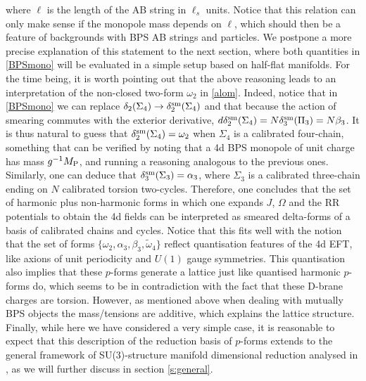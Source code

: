 \documentclass[11pt]{article}
\def\a {\alpha}
\def\b {\beta}
\def\om{\omega}
\begin{document}
where $\ell$ is the length of the AB string in $\ell_s$ units.  Notice that this relation can only make sense if the monopole mass depends on $\ell$, which should then be a feature of  backgrounds with BPS AB strings and particles. We postpone a more precise explanation of this statement to the next section, where both quantities in \eqref{BPSmono} will be evaluated in a simple setup based on half-flat manifolds. For the time being, it is worth pointing out that the above reasoning leads to an interpretation of the non-closed two-form $\om_2$ in \eqref{alom}. Indeed, notice that in \eqref{BPSmono} we can replace $\delta_2(\Sigma_4) \to \delta_2^{\rm sm}(\Sigma_4)$ and that because the action of smearing commutes with the exterior derivative, $d \delta_2^{\rm sm}(\Sigma_4) = N \delta_3^{\rm sm}(\Pi_3) = N \b_3$. It is thus natural to guess that $\delta_2^{\rm sm}(\Sigma_4) = \om_2$ when $\Sigma_4$ is a calibrated four-chain, something that can be verified by noting that a 4d BPS monopole of unit charge has mass $g^{-1} M_{\rm P}$, and running a reasoning analogous to the previous ones. Similarly, one can deduce that $\delta^{\rm sm}_3(\Sigma_3) = \a_3$, where $\Sigma_3$ is a calibrated three-chain ending on $N$ calibrated torsion two-cycles. Therefore, one concludes that the set of harmonic plus non-harmonic forms in which one expands $J$, $\Omega$ and the RR potentials to obtain the 4d fields can be interpreted as smeared delta-forms of a basis of calibrated chains and cycles. Notice that this fits well with the notion that the set of forms $\{ \om_2, \a_3, \b_3, \tilde{\om}_4\}$ reflect quantisation features of the 4d EFT, like axions of unit periodicity and $U(1)$ gauge symmetries. This quantisation also implies that these $p$-forms generate a lattice just like quantised harmonic $p$-forms do, which seems to be in contradiction with the fact that these D-brane charges are torsion. However, as mentioned above when dealing with mutually BPS objects the mass/tensions are additive, which explains the lattice structure. Finally, while here we have considered a very simple case, it is reasonable to expect that this description of the reduction basis of $p$-forms extends to the general framework of SU(3)-structure manifold dimensional reduction analysed in \cite{Grana:2005ny,Kashani-Poor:2006ofe}, as we will further discuss in section \ref{s:general}. 
\end{document}

